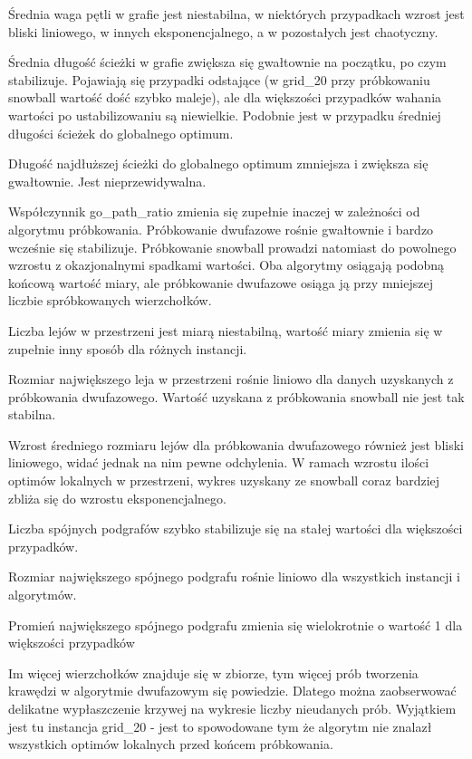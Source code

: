 Średnia waga pętli w grafie jest niestabilna, w niektórych przypadkach wzrost jest bliski liniowego, w innych
eksponencjalnego, a w pozostałych jest chaotyczny.

Średnia długość ścieżki w grafie zwiększa się gwałtownie na początku, po czym stabilizuje.
Pojawiają się przypadki odstające (w grid\_20 przy próbkowaniu snowball wartość dość szybko maleje),
ale dla większości przypadków wahania wartości po ustabilizowaniu są niewielkie.
Podobnie jest w przypadku średniej długości ścieżek do globalnego optimum.

Długość najdłuższej ścieżki do globalnego optimum zmniejsza i zwiększa się gwałtownie.
Jest nieprzewidywalna.

Współczynnik go\_path\_ratio zmienia się zupełnie inaczej w zależności od algorytmu próbkowania.
Próbkowanie dwufazowe rośnie gwałtownie i bardzo wcześnie się stabilizuje.
Próbkowanie snowball prowadzi natomiast do powolnego wzrostu z okazjonalnymi spadkami wartości.
Oba algorytmy osiągają podobną końcową wartość miary, ale próbkowanie dwufazowe osiąga ją przy mniejszej
liczbie spróbkowanych wierzchołków.

Liczba lejów w przestrzeni jest miarą niestabilną, wartość miary zmienia się w zupełnie inny sposób
dla różnych instancji.

Rozmiar największego leja w przestrzeni rośnie liniowo dla danych uzyskanych z próbkowania
dwufazowego. Wartość uzyskana z próbkowania snowball nie jest tak stabilna.

Wzrost średniego rozmiaru lejów dla próbkowania dwufazowego również jest bliski liniowego,
widać jednak na nim pewne odchylenia. W ramach wzrostu ilości optimów lokalnych w przestrzeni,
wykres uzyskany ze snowball coraz bardziej zbliża się do wzrostu eksponencjalnego.

Liczba spójnych podgrafów szybko stabilizuje się na stałej wartości dla większości przypadków.

Rozmiar największego spójnego podgrafu rośnie liniowo dla wszystkich instancji i algorytmów.

Promień największego spójnego podgrafu zmienia się wielokrotnie o wartość 1 dla większości przypadków

Im więcej wierzchołków znajduje się w zbiorze, tym więcej prób tworzenia krawędzi w algorytmie dwufazowym
się powiedzie. Dlatego można zaobserwować delikatne wypłaszczenie krzywej na wykresie liczby nieudanych prób.
Wyjątkiem jest tu instancja grid\_20  - jest to spowodowane tym że algorytm nie znalazł wszystkich optimów
lokalnych przed końcem próbkowania.

